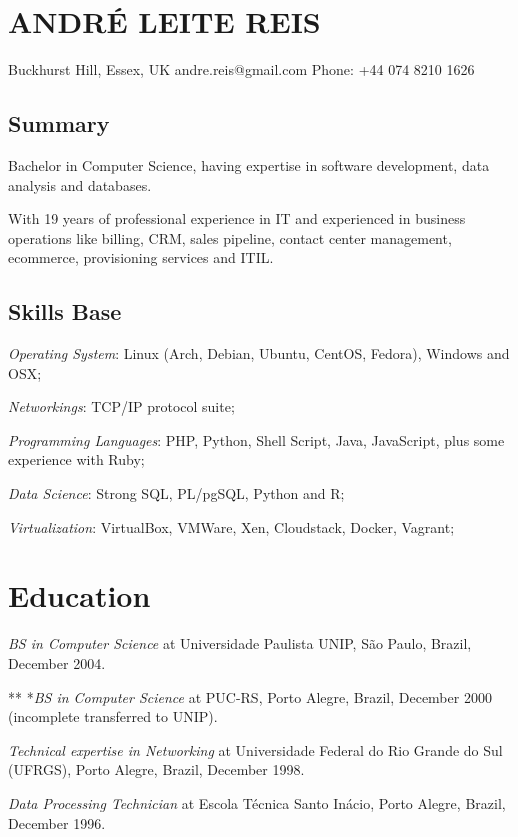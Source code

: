 \part{ANDRÉ LEITE REIS}
\label{andrÉleitereis}

Buckhurst Hill, Essex, UK
andre.reis@gmail.com
Phone: +44 074 8210 1626

\chapter{Summary}
\label{summary}

Bachelor in Computer Science, having expertise in software development, data analysis and databases.

With 19 years of professional experience in IT and experienced in business operations like billing, CRM, sales pipeline, contact center management, ecommerce, provisioning services and ITIL.

\chapter{Skills Base}
\label{skillsbase}

\emph{Operating System}: Linux (Arch, Debian, Ubuntu, CentOS, Fedora), Windows and OSX;

\emph{Networkings}: TCP\slash IP protocol suite;

\emph{Programming Languages}: PHP, Python, Shell Script, Java, JavaScript, plus some experience with Ruby;

\emph{Data Science}: Strong SQL, PL\slash pgSQL, Python and R;

\emph{Virtualization}: VirtualBox, VMWare, Xen, Cloudstack, Docker, Vagrant;

\part{Education}
\label{education}

\emph{BS in Computer Science} at Universidade Paulista UNIP, São Paulo, Brazil, December 2004.

** *\emph{BS in Computer Science} at PUC-RS, Porto Alegre, Brazil, December 2000 (incomplete transferred to UNIP).

\emph{Technical expertise in Networking} at Universidade Federal do Rio Grande do Sul (UFRGS), Porto Alegre, Brazil, December 1998.

\emph{Data Processing Technician} at Escola Técnica Santo Inácio, Porto Alegre, Brazil, December 1996.

